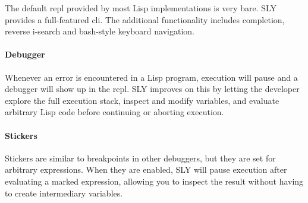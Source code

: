 The default \ac{repl} provided by most Lisp implementations is very bare.
SLY provides a full-featured \ac{cli}.
The additional functionality includes completion,
reverse i-search and bash-style keyboard navigation.

\paragraph{Debugger}

Whenever an error is encountered in a Lisp program,
execution will pause and a debugger will show up in the \ac{repl}.
SLY improves on this by letting the developer explore the full execution stack,
inspect and modify variables,
and evaluate arbitrary Lisp code before continuing or aborting execution.

\paragraph{Stickers}

Stickers are similar to breakpoints in other debuggers,
but they are set for arbitrary expressions.
When they are enabled,
SLY will pause execution after evaluating a marked expression,
allowing you to inspect the result without having to create intermediary variables.
